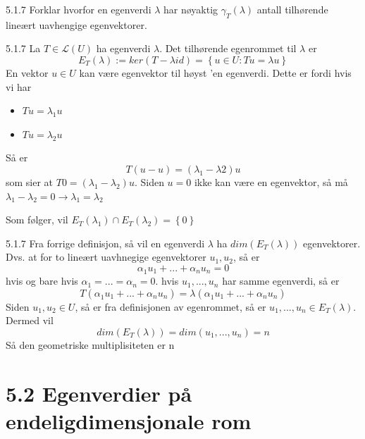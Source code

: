 \documentclass[a4paper,norsk]{article}
\begin{document}
\begin{oppgavebox}{5.1.7}{}
Forklar hvorfor en egenverdi $ \lambda  $ har nøyaktig $ \gamma_T ( \lambda ) $ antall tilhørende lineært uavhengige egenvektorer.

\begin{proofbox}{5.1.7}{}
La $ T \in \mathcal{L} (U) $ ha egenverdi $ \lambda  $. Det tilhørende egenrommet til $ \lambda  $ er 
\[
    E_T( \lambda ) := ker \left( T - \lambda id \right) = \left\{ u \in  U : Tu = \lambda u \right\} 
\]
En vektor $ u \in  U $ kan være egenvektor til høyst 'en egenverdi. Dette er fordi hvis vi har 
\begin{itemize}
    \item $ Tu = \lambda _1 u $
    \item $ Tu = \lambda _2 u $  
\end{itemize}
Så er 
\[
    T \left( u-u \right) = \left( 
        \lambda _1 - \lambda 2
     \right) u
\]
som sier at $ T0 = \left( \lambda _1 - \lambda _2 \right)u  $. Siden $ u=0 $ ikke kan være en egenvektor, så må $ \lambda _1 - \lambda _2 = 0 \rightarrow \lambda _1 = \lambda _2 $   

Som følger, vil $ E_T(\lambda_1) \cap E_T (\lambda_2) = \left\{ 0 \right\}  $ 
\end{proofbox}

\begin{proofbox}{5.1.7}{}
Fra forrige definisjon, så vil en egenverdi $ \lambda $ ha $ dim \left( E_T ( \lambda ) \right)  $  egenvektorer. Dvs. at for to lineært uavhnegige egenvektorer $ u_1, u_2 $, så er  
\[
    \alpha_{1}^{} u_1 + ... +  \alpha_{n}^{}  u_n = 0
\]
hvis og bare hvis $ \alpha_{1}^{} =...= \alpha_{n}^{}  =0 $. hvis $ u_1, ...,  u_n $ har samme egenverdi, så er 
\[
    T \left( \alpha_{1}^{} u_1 + ... +  \alpha_{n}^{}  u_n   \right) = \lambda \left( \alpha_{1}^{} u_1 + ... +  \alpha_{n}^{}  u_n \right) 
\]
Siden $ u_1, u_2 \in U $, så er fra definisjonen av egenrommet, så er $ u_1,..., u_n \in E_T ( \lambda  ) $. Dermed vil 
\[
    dim \left( E_T ( \lambda ) \right) = dim \left( u_1,..., u_n \right) = n
\]
Så den geometriske multiplisiteten er n
\end{proofbox}
\end{oppgavebox}




\section*{5.2 Egenverdier på endeligdimensjonale rom}
\end{document}
